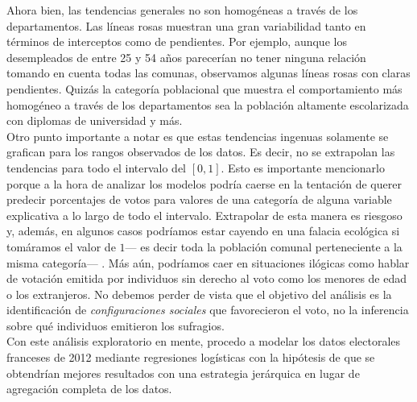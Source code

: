 Ahora bien, las tendencias generales no son homogéneas a través de los departamentos. Las líneas rosas muestran una gran variabilidad tanto en términos de interceptos como de pendientes. Por ejemplo, aunque los desempleados de entre 25 y 54 años parecerían no tener ninguna relación tomando en cuenta todas las comunas, observamos algunas líneas rosas con claras pendientes. Quizás la categoría poblacional que muestra el comportamiento más homogéneo a través de los departamentos sea la población altamente escolarizada con diplomas de universidad y más.\\

Otro punto importante a notar es que estas tendencias ingenuas solamente se grafican para los rangos observados de los datos. Es decir, no se extrapolan las tendencias para todo el intervalo del $[0,1]$. Esto es importante mencionarlo porque a la hora de analizar los modelos podría caerse en la tentación de querer predecir porcentajes de votos para valores de una categoría de alguna variable explicativa a lo largo de todo el intervalo. Extrapolar de esta manera es riesgoso y, además, en algunos casos podríamos estar cayendo en una falacia ecológica si tomáramos el valor de $1$--- es decir toda la población comunal perteneciente a la misma categoría--- . Más aún, podríamos caer en situaciones ilógicas como hablar de votación emitida por individuos sin derecho al voto como los menores de edad o los extranjeros. No debemos perder de vista que el objetivo del análisis es la identificación de \textit{configuraciones sociales} que favorecieron el voto, no la inferencia sobre qué individuos emitieron los sufragios.\label{No_Extrapolar}\\

Con este análisis exploratorio en mente, procedo a modelar los datos electorales franceses de 2012 mediante regresiones logísticas con la hipótesis de que se obtendrían mejores resultados con una estrategia jerárquica en lugar de agregación completa de los datos. 

